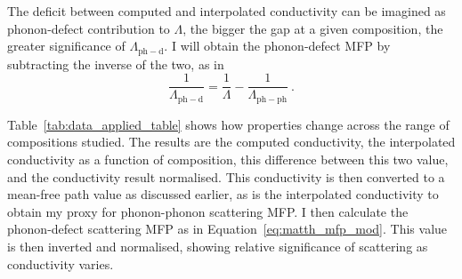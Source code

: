 The deficit between computed and interpolated conductivity can be imagined as phonon-defect contribution to $\Lambda$, the bigger the gap at a given composition, the greater significance of $\Lambda_{\mathrm{ph-d}}$. I will obtain the phonon-defect MFP by subtracting the inverse of the two, as in 
%
\begin{equation}
\frac{1}{\Lambda_{\mathrm{ph-d}}}=\frac{1}{\Lambda}-\frac{1}{\Lambda_{\mathrm{ph-ph}}}\ .
\label{eq:matth_mfp_mod2}
\end{equation}

Table~\ref{tab:data_applied_table} shows how properties change across the range of compositions studied. The results are the computed conductivity, the interpolated conductivity as a function of composition, this difference between this two value, and the conductivity result normalised. This conductivity is then converted to a mean-free path value as discussed earlier, as is the interpolated conductivity to obtain my proxy for phonon-phonon scattering MFP. I then calculate the phonon-defect scattering MFP as in Equation~\ref{eq:matth_mfp_mod}. This value is then inverted and normalised, showing relative significance of scattering as conductivity varies.





